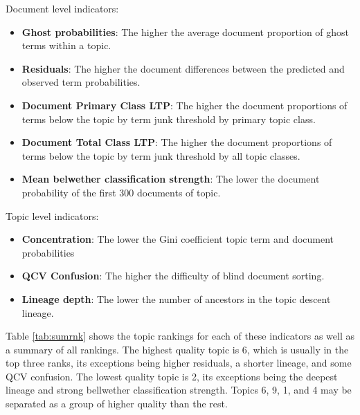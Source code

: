 \documentclass[]{book}
\providecommand{\tightlist}{%
  \setlength{\itemsep}{0pt}\setlength{\parskip}{0pt}}
\theoremstyle{definition}
\theoremstyle{definition}
\theoremstyle{definition}
\theoremstyle{remark}
\begin{document}
Document level indicators:

\begin{itemize}
\tightlist
\item
  \textbf{Ghost probabilities}: The higher the average document
  proportion of ghost terms within a topic.
\item
  \textbf{Residuals}: The higher the document differences between the
  predicted and observed term probabilities.
\item
  \textbf{Document Primary Class LTP}: The higher the document
  proportions of terms below the topic by term junk threshold by primary
  topic class.
\item
  \textbf{Document Total Class LTP}: The higher the document proportions
  of terms below the topic by term junk threshold by all topic classes.
\item
  \textbf{Mean belwether classification strength}: The lower the
  document probability of the first 300 documents of topic.
\end{itemize}

Topic level indicators:

\begin{itemize}
\tightlist
\item
  \textbf{Concentration}: The lower the Gini coefficient topic term and
  document probabilities
\item
  \textbf{QCV Confusion}: The higher the difficulty of blind document
  sorting.
\item
  \textbf{Lineage depth}: The lower the number of ancestors in the topic
  descent lineage.
\end{itemize}

Table \ref{tab:sumrnk} shows the topic rankings for each of these
indicators as well as a summary of all rankings. The highest quality
topic is 6, which is usually in the top three ranks, its exceptions
being higher residuals, a shorter lineage, and some QCV confusion. The
lowest quality topic is 2, its exceptions being the deepest lineage and
strong bellwether classification strength. Topics 6, 9, 1, and 4 may be
separated as a group of higher quality than the rest.
\end{document}
